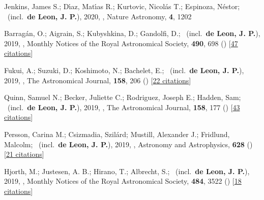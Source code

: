\item[{\color{numcolor}\scriptsize18}] Jenkins, James S.; D{\'\i}az, Mat{\'\i}as R.; Kurtovic, Nicol{\'a}s T.; Espinoza, N{\'e}stor; \etal\ (incl.\ \textbf{de Leon, J. P.}), 2020, , Nature Astronomy, \textbf{4}, 1202

\item[{\color{numcolor}\scriptsize17}] Barrag{\'a}n, O.; Aigrain, S.; Kubyshkina, D.; Gandolfi, D.; \etal\ (incl.\ \textbf{de Leon, J. P.}), 2019, , Monthly Notices of the Royal Astronomical Society, \textbf{490}, 698 () [\href{https://ui.adsabs.harvard.edu/abs/2019MNRAS.490..698B}{47 citations}]

\item[{\color{numcolor}\scriptsize16}] Fukui, A.; Suzuki, D.; Koshimoto, N.; Bachelet, E.; \etal\ (incl.\ \textbf{de Leon, J. P.}), 2019, , The Astronomical Journal, \textbf{158}, 206 () [\href{https://ui.adsabs.harvard.edu/abs/2019AJ....158..206F}{22 citations}]

\item[{\color{numcolor}\scriptsize15}] Quinn, Samuel N.; Becker, Juliette C.; Rodriguez, Joseph E.; Hadden, Sam; \etal\ (incl.\ \textbf{de Leon, J. P.}), 2019, , The Astronomical Journal, \textbf{158}, 177 () [\href{https://ui.adsabs.harvard.edu/abs/2019AJ....158..177Q}{43 citations}]

\item[{\color{numcolor}\scriptsize14}] Persson, Carina M.; Csizmadia, Szil{\'a}rd; Mustill, Alexander J.; Fridlund, Malcolm; \etal\ (incl.\ \textbf{de Leon, J. P.}), 2019, , Astronomy and Astrophysics, \textbf{628} () [\href{https://ui.adsabs.harvard.edu/abs/2019A&A...628A..64P}{21 citations}]

\item[{\color{numcolor}\scriptsize13}] Hjorth, M.; Justesen, A. B.; Hirano, T.; Albrecht, S.; \etal\ (incl.\ \textbf{de Leon, J. P.}), 2019, , Monthly Notices of the Royal Astronomical Society, \textbf{484}, 3522 () [\href{https://ui.adsabs.harvard.edu/abs/2019MNRAS.484.3522H}{18 citations}]

